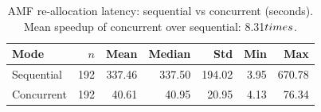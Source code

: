 \begin{table}[htbp]
\centering
\caption{AMF re-allocation latency: sequential vs concurrent (seconds). Mean speedup of concurrent over sequential: 8.31$\\times$.}
\label{tab:comparison}
\begin{tabular}{lrrrrrr}
\hline
Mode & $n$ & Mean & Median & Std & Min & Max \\
\hline
Sequential & 192 & 337.46 & 337.50 & 194.02 & 3.95 & 670.78 \\
Concurrent & 192 & 40.61 & 40.95 & 20.95 & 4.13 & 76.34 \\
\hline
\end{tabular}
\end{table}
